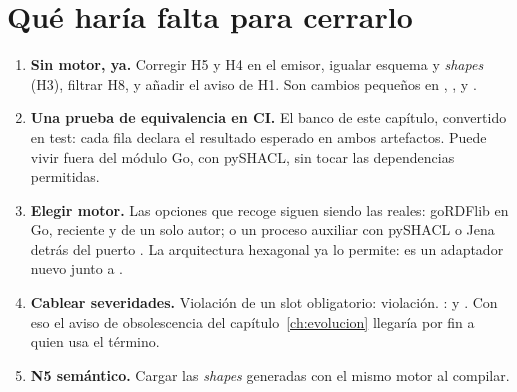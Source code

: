\section{Qué haría falta para cerrarlo}

\begin{enumerate}[leftmargin=*, itemsep=3pt]
  \item \textbf{Sin motor, ya.} Corregir H5 y H4 en el emisor, igualar esquema y \emph{shapes} (H3), filtrar
        H8, y añadir el aviso de H1. Son cambios pequeños en , ,
         y .
  \item \textbf{Una prueba de equivalencia en CI.} El banco de este capítulo, convertido en test: cada fila
        declara el resultado esperado en ambos artefactos. Puede vivir fuera del módulo Go, con pySHACL, sin
        tocar las dependencias permitidas.
  \item \textbf{Elegir motor.} Las opciones que recoge  siguen siendo las reales:
        goRDFlib en Go, reciente y de un solo autor; o un proceso auxiliar con pySHACL o Jena detrás del puerto
        . La arquitectura hexagonal ya lo permite: es un adaptador nuevo junto a
        .
  \item \textbf{Cablear severidades.} Violación de un slot obligatorio: violación. :
         y . Con eso el aviso de obsolescencia del
        capítulo~\ref{ch:evolucion} llegaría por fin a quien usa el término.
  \item \textbf{N5 semántico.} Cargar las \emph{shapes} generadas con el mismo motor al compilar.
\end{enumerate}
